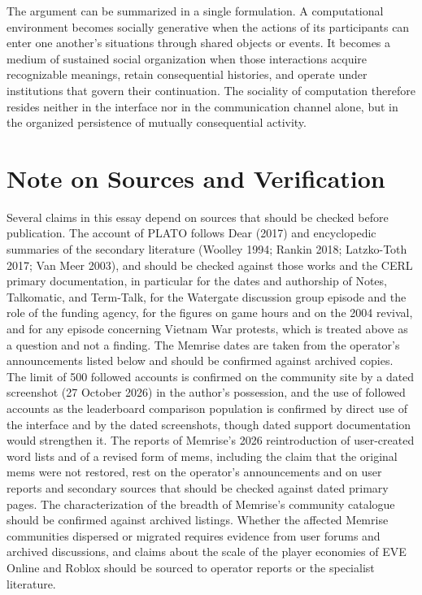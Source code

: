 \documentclass[11pt]{article}
\theoremstyle{remark}
\begin{document}
The argument can be summarized in a single formulation. A computational environment becomes socially generative when the actions of its participants can enter one another's situations through shared objects or events. It becomes a medium of sustained social organization when those interactions acquire recognizable meanings, retain consequential histories, and operate under institutions that govern their continuation. The sociality of computation therefore resides neither in the interface nor in the communication channel alone, but in the organized persistence of mutually consequential activity.

\section*{Note on Sources and Verification}

Several claims in this essay depend on sources that should be checked before publication. The account of PLATO follows Dear (2017) and encyclopedic summaries of the secondary literature (Woolley 1994; Rankin 2018; Latzko-Toth 2017; Van Meer 2003), and should be checked against those works and the CERL primary documentation, in particular for the dates and authorship of Notes, Talkomatic, and Term-Talk, for the Watergate discussion group episode and the role of the funding agency, for the figures on game hours and on the 2004 revival, and for any episode concerning Vietnam War protests, which is treated above as a question and not a finding. The Memrise dates are taken from the operator's announcements listed below and should be confirmed against archived copies. The limit of 500 followed accounts is confirmed on the community site by a dated screenshot (27 October 2026) in the author's possession, and the use of followed accounts as the leaderboard comparison population is confirmed by direct use of the interface and by the dated screenshots, though dated support documentation would strengthen it. The reports of Memrise's 2026 reintroduction of user-created word lists and of a revised form of mems, including the claim that the original mems were not restored, rest on the operator's announcements and on user reports and secondary sources that should be checked against dated primary pages. The characterization of the breadth of Memrise's community catalogue should be confirmed against archived listings. Whether the affected Memrise communities dispersed or migrated requires evidence from user forums and archived discussions, and claims about the scale of the player economies of EVE Online and Roblox should be sourced to operator reports or the specialist literature.
\end{document}
